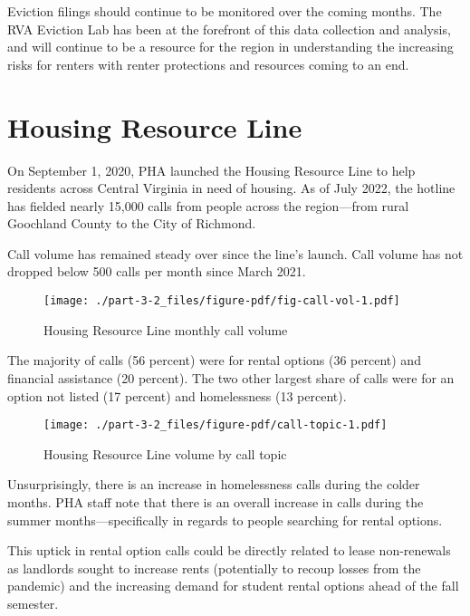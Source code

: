 \documentclass[
  letterpaper,
  DIV=11,
  numbers=noendperiod]{scrreprt}
\begin{document}
Eviction filings should continue to be monitored over the coming months.
The RVA Eviction Lab has been at the forefront of this data collection
and analysis, and will continue to be a resource for the region in
understanding the increasing risks for renters with renter protections
and resources coming to an end.

\hypertarget{housing-resource-line}{%
\section{Housing Resource Line}\label{housing-resource-line}}

On September 1, 2020, PHA launched the Housing Resource Line to help
residents across Central Virginia in need of housing. As of July 2022,
the hotline has fielded nearly 15,000 calls from people across the
region---from rural Goochland County to the City of Richmond.

Call volume has remained steady over since the line's launch. Call
volume has not dropped below 500 calls per month since March 2021.

\begin{figure}

{\centering \texttt{[image: ./part-3-2\_files/figure-pdf/fig-call-vol-1.pdf]}

}

\caption{\label{fig-call-vol}Housing Resource Line monthly call volume}

\end{figure}

The majority of calls (56 percent) were for rental options (36 percent)
and financial assistance (20 percent). The two other largest share of
calls were for an option not listed (17 percent) and homelessness (13
percent).

\begin{figure}

{\centering \texttt{[image: ./part-3-2\_files/figure-pdf/call-topic-1.pdf]}

}

\caption{Housing Resource Line volume by call topic}

\end{figure}

Unsurprisingly, there is an increase in homelessness calls during the
colder months. PHA staff note that there is an overall increase in calls
during the summer months---specifically in regards to people searching
for rental options.

This uptick in rental option calls could be directly related to lease
non-renewals as landlords sought to increase rents (potentially to
recoup losses from the pandemic) and the increasing demand for student
rental options ahead of the fall semester.
\end{document}
